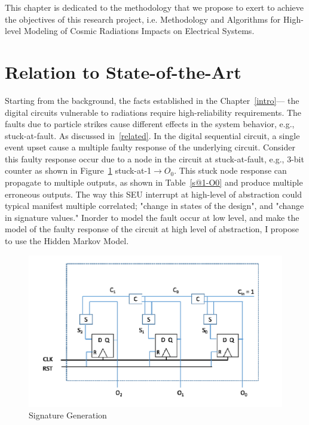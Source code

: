 
This chapter is dedicated to the methodology that we propose to exert to achieve the objectives of this research project, i.e. Methodology and Algorithms for High-level Modeling of Cosmic Radiations Impacts on Electrical Systems.





\section{Relation to State-of-the-Art}
Starting from the background, the facts established in the Chapter~\ref{intro}--- the digital circuits vulnerable to radiations require high-reliability requirements. The faults due to particle strikes cause different effects in the system behavior, e.g., stuck-at-fault. As discussed in~\ref{related}. In the digital sequential circuit, a single event upset cause a multiple faulty response of the underlying circuit. Consider this faulty response occur due to a node in the circuit at stuck-at-fault, e.g., 3-bit counter as shown in Figure~\ref{fig:counter} stuck-at-1$\rightarrow O_0$. This stuck node response can propagate to multiple outputs, as shown in Table~\ref{s@1-O0} and produce multiple erroneous outputs. The way this SEU interrupt at high-level of abstraction could typical manifest multiple correlated; "change in states of the design", and "change in signature values." Inorder to model the fault occur at low level, and make the model of the faulty response of the circuit at high level of abstraction, I propose to use the Hidden Markov Model. 



\begin{figure}[tb!]

 \centering
  \captionsetup{justification=centering}    
   \includegraphics[scale=0.6]{Figures/counter.png}
   \caption{Signature Generation}
\label{fig:counter}
\end{figure}



